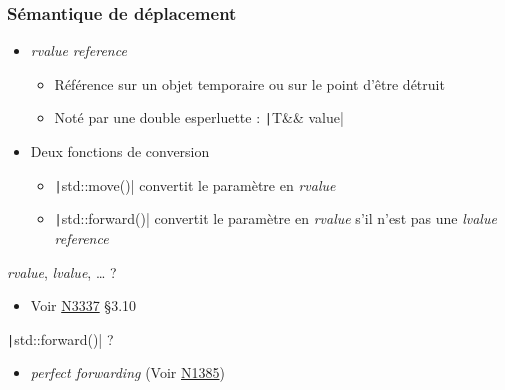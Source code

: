 \documentclass[C++.tex]{subfiles}
\begin{document}
\begin{frame}[fragile]
	\frametitle{Sémantique de déplacement}
	\begin{itemize}
		\item \textit{rvalue reference}
		\begin{itemize}
			\item Référence sur un objet temporaire ou sur le point d'être détruit
			\item Noté par une double esperluette : \texttt|T&& value|
		\end{itemize}
		\item Deux fonctions de conversion
		\begin{itemize}
			\item \texttt|std::move()| convertit le paramètre en \textit{rvalue}


			\item \texttt|std::forward()| convertit le paramètre en \textit{rvalue} s'il n'est pas une \textit{lvalue reference}
		\end{itemize}
	\end{itemize}

	\begin{block}{\textit{rvalue}, \textit{lvalue}, \ldots{} ?}
		\begin{itemize}
			\item Voir \href{http://www.open-std.org/jtc1/sc22/wg21/docs/papers/2012/n3337.pdf}{N3337} §3.10
		\end{itemize}
	\end{block}

	\begin{block}{\texttt|std::forward()| ?}
		\begin{itemize}
			\item \textit{perfect forwarding} (Voir \href{http://www.open-std.org/jtc1/sc22/wg21/docs/papers/2002/n1385.htm}{N1385})
		\end{itemize}
	\end{block}
\end{frame}
\end{document}
